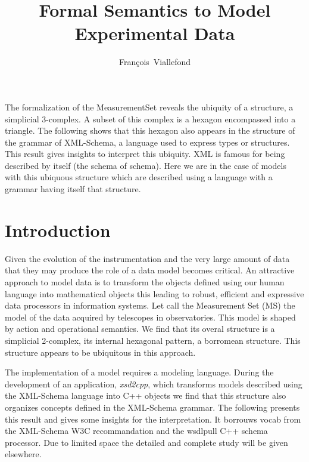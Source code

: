 
\resetcounters


\title{Formal Semantics to Model Experimental Data}
\author{Fran\c{c}ois~Viallefond
}


\abstract
The formalization of the MeasurementSet reveals the ubiquity of a 
structure, a simplicial 3-complex. A subset of this complex is 
a hexagon encompassed into a triangle.
The following shows that this hexagon also appears in the structure 
of the grammar of XML-Schema, a language used to express types or structures.
This result gives insights to interpret this ubiquity.
XML is famous for being described by itself (the schema of schema).
Here we are in the case of models with this ubiquous structure 
which are described using a language with a grammar having itself 
that structure.


\section{Introduction}
Given the evolution of the instrumentation and the very large amount
of data that they may produce the role of a data model becomes critical.
An attractive approach to model data is to transform the objects defined
using our human language into mathematical objects this leading
to robust, efficient and expressive data processors
in information systems. Let call the Measurement Set (MS) the model
of the data acquired by telescopes in observatories. This model
is shaped by action and operational semantics. We find that its
overal structure is a simplicial 2-complex, its internal hexagonal pattern,
a borromean structure.
This structure appears to be ubiquitous in this approach.

The implementation of a model requires a modeling language.
During the development of an application, {\it xsd2cpp}, which transforms 
models described using the XML-Schema language into C++ objects we find that 
this structure also organizes concepts defined in the XML-Schema grammar. 
The following presents this result and gives some insights for the interpretation.
It borrouws vocab from the XML-Schema W3C recommandation and the wsdlpull C++
schema processor. 
Due to limited space the detailed and complete study will be given elsewhere.

